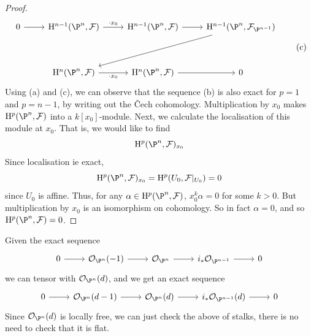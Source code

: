 \documentclass{article}
\begin{document}
\begin{proof}
    \[\begin{tikzcd}
        0 & {\HH^{n-1}(\P^n, \mcF)} & {\HH^{n-1}(\P^n, \mcF)} & {\HH^{n-1}(\P^n, \mcF_{\P^{n-1}})} \\
        \\
        & {\HH^n(\P^n, \mcF)} & {\HH^n(\P^n, \mcF)} & 0
        \arrow[from=1-1, to=1-2]
        \arrow["{\cdot x_0}", from=1-2, to=1-3]
        \arrow[from=1-3, to=1-4]
        \arrow[from=1-4, to=3-2]
        \arrow["{\cdot x_0}"', from=3-2, to=3-3]
        \arrow[from=3-3, to=3-4]
    \end{tikzcd} \tag{c}\]
    Using (a) and (c), we can observe that the sequence (b) is also exact for \(p = 1\) and \(p = n-1\), by writing out the \v Cech cohomology. Multiplication by \(x_0\) makes \(\HH^p(\P^n, \mcF)\) into a \(k[x_0]\)-module. Next, we calculate the localisation of this module at \(x_0\). That is, we would like to find
    \[\HH^p(\P^n, \mcF)_{x_0}\]
    Since localisation ie exact,
    \[\HH^p(\P^n, \mcF)_{x_0} = \HH^p(U_0, \mcF\vert_{U_0}) = 0\]
    since \(U_0\) is affine. Thus, for any \(\alpha \in \HH^p(\P^n, \mcF)\), \(x_0^k\alpha = 0\) for some \(k > 0\). But multiplication by \(x_0\) is an isomorphism on cohomology. So in fact \(\alpha = 0\), and so \(\HH^p(\P^n, \mcF) = 0\).
\end{proof}

Given the exact sequence
\[\begin{tikzcd}
	0 & {\mcO_{\P^n}(-1)} & {\mcO_{\P^n}} & {i_*\mcO_{\P^{n-1}}} & 0
	\arrow[from=1-1, to=1-2]
	\arrow[from=1-2, to=1-3]
	\arrow[from=1-3, to=1-4]
	\arrow[from=1-4, to=1-5]
\end{tikzcd}\]
we can tensor with \(\mcO_{\P^n}(d)\), and we get an exact sequence
\[\begin{tikzcd}
	0 & {\mcO_{\P^n}(d-1)} & {\mcO_{\P^n}(d)} & {i_*\mcO_{\P^{n-1}}(d)} & 0
	\arrow[from=1-1, to=1-2]
	\arrow[from=1-2, to=1-3]
	\arrow[from=1-3, to=1-4]
	\arrow[from=1-4, to=1-5]
\end{tikzcd}\]
Since \(\mcO_{\P^n}(d)\) is locally free, we can just check the above of stalks, there is no need to check that it is flat.
\end{document}
